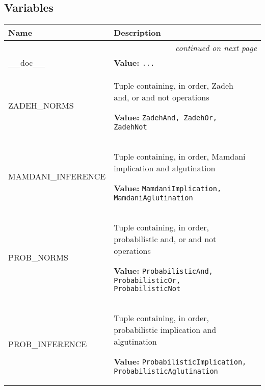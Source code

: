 
  \subsection{Variables}

\begin{longtable}{|p{}|p{}|l}
\cline{1-2}
\cline{1-2} \centering \textbf{Name} & \centering \textbf{Description}& \\
\cline{1-2}
\endhead\cline{1-2}\multicolumn{3}{r}{\small\textit{continued on next page}}\\\endfoot\cline{1-2}
\endlastfoot\raggedright \_\-\_\-d\-o\-c\-\_\-\_\- & \raggedright \textbf{Value:} 
{\tt \texttt{...}}&\\
\cline{1-2}
\raggedright Z\-A\-D\-E\-H\-\_\-N\-O\-R\-M\-S\- & \raggedright Tuple containing, in order, Zadeh and, or and not operations

\textbf{Value:} 
{\tt ZadehAnd, ZadehOr, ZadehNot}&\\
\cline{1-2}
\raggedright M\-A\-M\-D\-A\-N\-I\-\_\-I\-N\-F\-E\-R\-E\-N\-C\-E\- & \raggedright Tuple containing, in order, Mamdani implication and algutination

\textbf{Value:} 
{\tt MamdaniImplication, MamdaniAglutination}&\\
\cline{1-2}
\raggedright P\-R\-O\-B\-\_\-N\-O\-R\-M\-S\- & \raggedright Tuple containing, in order, probabilistic and, or and not operations

\textbf{Value:} 
{\tt ProbabilisticAnd, ProbabilisticOr, ProbabilisticNot}&\\
\cline{1-2}
\raggedright P\-R\-O\-B\-\_\-I\-N\-F\-E\-R\-E\-N\-C\-E\- & \raggedright Tuple containing, in order, probabilistic implication and algutination

\textbf{Value:} 
{\tt ProbabilisticImplication, ProbabilisticAglutination}&\\
\cline{1-2}
\end{longtable}

